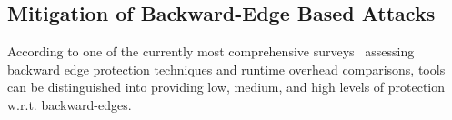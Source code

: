 % 

\subsection{Mitigation of Backward-Edge Based Attacks}
\label{Mitigation of Return Edge Attacks}
According to one of the currently most comprehensive surveys~\cite{cfi:survey} assessing backward edge protection techniques and runtime overhead comparisons, tools can be distinguished into providing
 low, medium, and high levels of protection w.r.t. backward-edges. %

